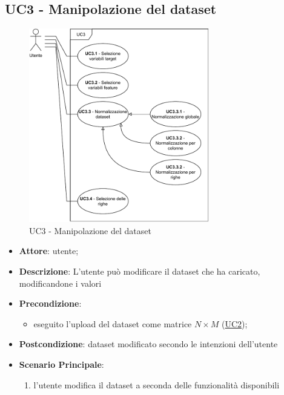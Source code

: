 \subsection{UC3 - Manipolazione del dataset}
\label{uc3}

    \begin{figure}[htbp]
        \centering
        \includegraphics[width=0.7\textwidth]{source/sections/casi-uso/diagrams/uc3.pdf}
        \caption{UC3 - Manipolazione del dataset}
        \label{fig:uc3}
    \end{figure}
    
    \begin{itemize}
    \item \textbf{Attore}: utente;
    \item \textbf{Descrizione}: L'utente può modificare il dataset che ha caricato, modificandone i valori 
    \item \textbf{Precondizione}:
    \begin{itemize}
        \item eseguito l'upload del dataset come matrice $N\times M$ (\hyperref[uc2]{UC2});
    \end{itemize}
    \item \textbf{Postcondizione}: dataset modificato secondo le intenzioni dell'utente
    \item \textbf{Scenario Principale}: 
    \begin{enumerate}
        \item l'utente modifica il dataset a seconda delle funzionalità disponibili
    \end{enumerate}  
    \end{itemize}


